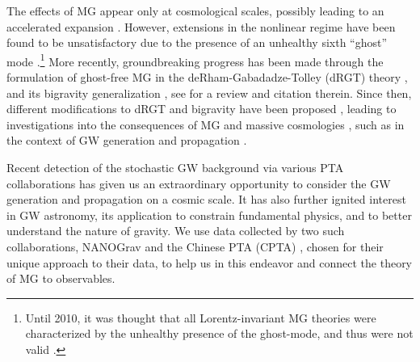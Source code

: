 \documentclass[prd,twocolumn,aps,psfig,nofootinbib,nobibnotes,superscriptaddress,preprintnumbers,times]{revtex4-2}
\begin{document}
The effects of MG appear only at cosmological scales, possibly leading to an accelerated expansion \cite{DAmico:2011eto}.
However, extensions in the nonlinear regime have been found to be unsatisfactory due to the presence of an unhealthy sixth ``ghost'' mode \cite{Boulware:1972yco}.\footnote{Until 2010, it was thought that all Lorentz-invariant MG theories were characterized by the unhealthy presence of the ghost-mode, and thus were not valid \cite{deRham:2010kj}.}
More recently, groundbreaking progress has been made through the formulation of ghost-free MG in the deRham-Gabadadze-Tolley (dRGT) theory \cite{deRham:2010ik,deRham:2010kj}, and its bigravity generalization \cite{Hassan:2011zd}, see \cite{deRham:2023ngf} for a review and citation therein. Since then, different modifications to dRGT and bigravity have been proposed \cite{Hinterbichler:2011tt,deRham:2014zqa,Koyama:2015vza,deRham:2016nuf,Hinterbichler:2016try, Cusin:2016ytz, Kenna-Allison:2019tbu,Kazempour:2022giy}, 
leading to investigations into the consequences of MG and massive cosmologies 
\cite{DAmico:2011eto,Gratia:2012wt,Gumrukcuoglu:2012aa,Maeda:2013bha,Akrami:2013pna,Zhang:2013noa,Lambiase:2012fv,Koyama:2011wx,Tasinato:2012ze,Solomon:2014iwa, Akrami:2013ffa,Koennig:2014ods,Gumrukcuoglu:2016hic}, 
such as in the context of  
GW generation and propagation \cite{DeFelice:2013awa,Gumrukcuoglu:2013nza,DeFelice:2013bxa,DeFelice:2015moy,Babichev:2015xha,Sakstein:2017bws}. 

Recent detection of the stochastic GW background via various PTA collaborations \cite{Agazie:2023, Xu:2023wog,EPTA:2023sfo,EPTA:2023akd,EPTA:2023fyk, Zic:2023gta,Reardon:2023gzh} has given us an extraordinary opportunity to consider the GW generation and propagation on a cosmic scale. It has also further ignited interest in GW astronomy, its application to constrain fundamental physics, and to better understand the nature of gravity. We use data collected by two such collaborations, NANOGrav \cite{Agazie:2023} and the Chinese PTA (CPTA) \cite{Xu:2023wog}, chosen for their unique approach to their data, to help us in this endeavor and connect the theory of MG to observables. 
\end{document}
